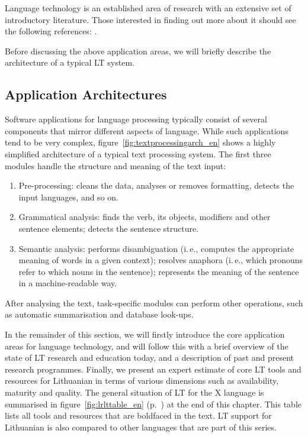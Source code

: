 \begin{multicols}{2}
Language technology is an established area of research with an extensive set of introductory literature. Those interested in finding out more about it should see the following references:  \cite{carstensen-etal1, jurafsky-martin01, manning-schuetze1, lt-world1, lt-survey1}.

Before discussing the above application areas, we will briefly describe the architecture of a typical LT system.

\subsection{Application Architectures}

Software applications for language processing typically consist of several components that mirror different aspects of language. While such applications tend to be very complex, figure~\ref{fig:textprocessingarch_en} shows a highly simplified architecture of a typical text processing system. The first three modules handle the structure and meaning of the text input:

\begin{enumerate}
\item Pre-processing: cleans the data, analyses or removes formatting, detects the input languages, and so on.
\item Grammatical analysis: finds the verb, its objects, modifiers and other sentence elements; detects the sentence structure.
\item Semantic analysis: performs disambiguation (i.\,e., computes the appropriate meaning of words in a given context); resolves anaphora (i.\,e., which pronouns refer to which nouns in the sentence); represents the meaning of the sentence in a machine-readable way.
\end{enumerate}

After analysing the text, task-specific modules can perform other operations, such as automatic summarisation and database look-ups.

In the remainder of this section, we will firstly introduce the core application areas for language technology, and will follow this with a brief overview of the state of LT research and education today, and a description of past and present research programmes. Finally, we present an expert estimate of core LT tools and resources for Lithuanian in terms of various dimensions such as availability, maturity and quality. The general situation of LT for the X language is summarised in figure~\ref{fig:lrlttable_en} (p.~\pageref{fig:lrlttable_en}) at the end of this chapter. This table lists all tools and resources that are boldfaced in the text. LT support for Lithuanian is also compared to other languages that are part of this series.


\end{multicols}
